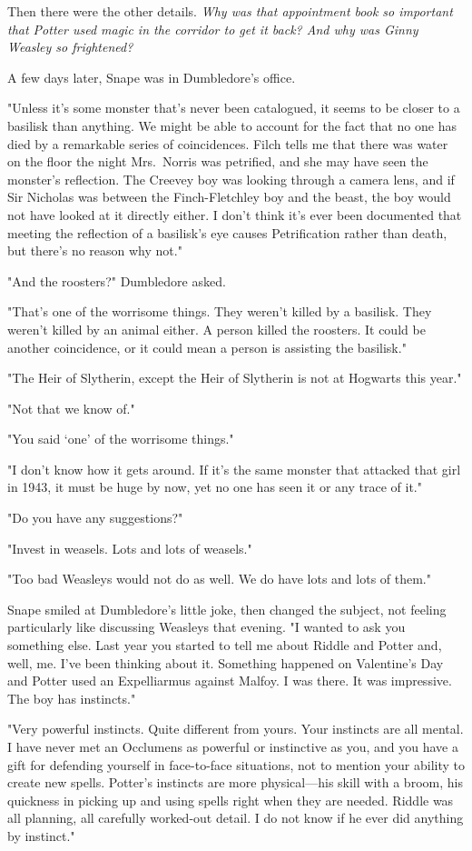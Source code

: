 Then there were the other details. \emph{Why was that appointment book so important that Potter used magic in the corridor to get it back? And why was Ginny Weasley so frightened?}

A few days later, Snape was in Dumbledore's office.

"Unless it's some monster that's never been catalogued, it seems to be closer to a basilisk than anything. We might be able to account for the fact that no one has died by a remarkable series of coincidences. Filch tells me that there was water on the floor the night Mrs.~Norris was petrified, and she may have seen the monster's reflection. The Creevey boy was looking through a camera lens, and if Sir Nicholas was between the Finch-Fletchley boy and the beast, the boy would not have looked at it directly either. I don't think it's ever been documented that meeting the reflection of a basilisk's eye causes Petrification rather than death, but there's no reason why not."

"And the roosters?" Dumbledore asked.

"That's one of the worrisome things. They weren't killed by a basilisk. They weren't killed by an animal either. A person killed the roosters. It could be another coincidence, or it could mean a person is assisting the basilisk."

"The Heir of Slytherin, except the Heir of Slytherin is not at Hogwarts this year."

"Not that we know of."

"You said `one' of the worrisome things."

"I don't know how it gets around. If it's the same monster that attacked that girl in 1943, it must be huge by now, yet no one has seen it or any trace of it."

"Do you have any suggestions?"

"Invest in weasels. Lots and lots of weasels."

"Too bad Weasleys would not do as well. We do have lots and lots of them."

Snape smiled at Dumbledore's little joke, then changed the subject, not feeling particularly like discussing Weasleys that evening. "I wanted to ask you something else. Last year you started to tell me about Riddle and Potter and, well, me. I've been thinking about it. Something happened on Valentine's Day and Potter used an Expelliarmus against Malfoy. I was there. It was impressive. The boy has{\el} instincts."

"Very powerful instincts. Quite different from yours. Your instincts are all mental. I have never met an Occlumens as powerful or instinctive as you, and you have a gift for defending yourself in face-to-face situations, not to mention your ability to create new spells. Potter's instincts are more physical—his skill with a broom, his quickness in picking up and using spells right when they are needed. Riddle was all planning, all carefully worked-out detail. I do not know if he ever did anything by instinct."

